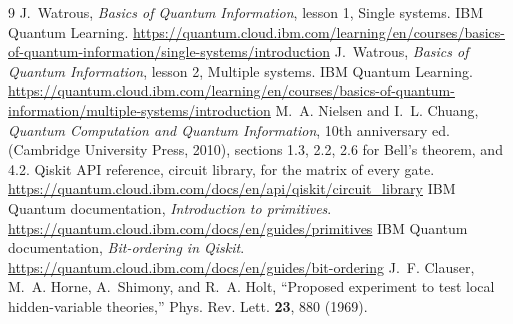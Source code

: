 \documentclass[11pt]{article}
\begin{document}
\begin{thebibliography}{9}
 J.~Watrous, \emph{Basics of Quantum Information}, lesson 1, Single systems. IBM Quantum Learning. \url{https://quantum.cloud.ibm.com/learning/en/courses/basics-of-quantum-information/single-systems/introduction}
 J.~Watrous, \emph{Basics of Quantum Information}, lesson 2, Multiple systems. IBM Quantum Learning. \url{https://quantum.cloud.ibm.com/learning/en/courses/basics-of-quantum-information/multiple-systems/introduction}
 M.~A. Nielsen and I.~L. Chuang, \emph{Quantum Computation and Quantum Information}, 10th anniversary ed. (Cambridge University Press, 2010), sections 1.3, 2.2, 2.6 for Bell's theorem, and 4.2.
 Qiskit API reference, circuit library, for the matrix of every gate. \url{https://quantum.cloud.ibm.com/docs/en/api/qiskit/circuit_library}
 IBM Quantum documentation, \emph{Introduction to primitives}. \url{https://quantum.cloud.ibm.com/docs/en/guides/primitives}
 IBM Quantum documentation, \emph{Bit-ordering in Qiskit}. \url{https://quantum.cloud.ibm.com/docs/en/guides/bit-ordering}
 J.~F. Clauser, M.~A. Horne, A.~Shimony, and R.~A. Holt, ``Proposed experiment to test local hidden-variable theories,'' Phys. Rev. Lett. \textbf{23}, 880 (1969).
\end{thebibliography}
\end{document}
